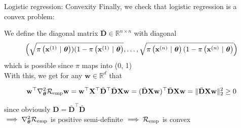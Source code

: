 \documentclass[11pt,compress,t,notes=noshow, xcolor=table]{beamer}
\begin{document}
\begin{frame}{Logistic regression: Convexity}
Finally, we check that logistic regression is a convex problem:
\vfill

We define the diagonal matrix $\bar{\mathbf{D}} \in \mathbb{R}^{n \times n}$ with diagonal 
$$\Big(\sqrt{\pixit[1])(1-\pixit[1]}, \dots, \sqrt{\pixit[n](1-\pixit[n]}\Big) $$
which is possible since $\pi$ maps into (0, 1) \\
\vfill
With this, we get for any $\mathbf{w} \in \mathbb{R}^d$ that

$$\mathbf{w}^\top  \nabla^2_{\thetav}\riske \mathbf{w} =   \mathbf{w}^\top  \mathbf{X}^\top \bar{\mathbf{D}}^\top \bar{\mathbf{D}}\mathbf{X} \mathbf{w} = (\bar{\mathbf{D}}\mathbf{X} \mathbf{w})^\top\bar{\mathbf{D}}\mathbf{X} \mathbf{w} = \Vert \bar{\mathbf{D}}\mathbf{X} \mathbf{w} \Vert^2_2 \geq 0$$

since obviously $\mathbf{D} = \bar{\mathbf{D}}^\top \bar{\mathbf{D}}$ \\
\vfill
$\implies \nabla^2_{\thetav}\riske$ is positive semi-definite $\implies \riske$ is convex

\end{frame}

\endlecture
\end{document}
